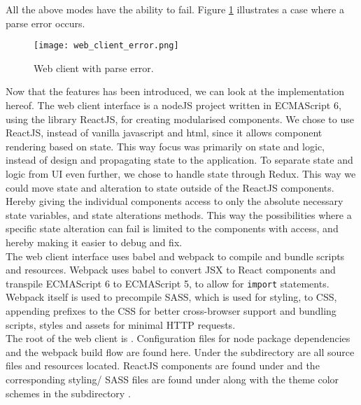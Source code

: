 \noindent
All the above modes have the ability to fail. Figure \ref{fig:web_client_error} illustrates a case where a parse error occurs.

\begin{figure}[H]
  \texttt{[image: web\_client\_error.png]}
  \caption{Web client with parse error.}
  \label{fig:web_client_error}
\end{figure}


\noindent
Now that the features has been introduced, we can look at the implementation hereof.
The web client interface is a nodeJS project written in ECMAScript 6, using the library ReactJS, for creating modularised components.
We chose to use ReactJS, instead of vanilla javascript and html, since it allows component rendering based on state.
This way focus was primarily on state and logic, instead of design and propagating state to the application.
To separate state and logic from UI even further, we chose to handle state through Redux.
This way we could move state and alteration to state outside of the ReactJS components. Hereby giving the individual components access to only the absolute necessary state variables, and state alterations methods.
This way the possibilities where a specific state alteration can fail is limited to the components with access, and hereby making it easier to debug and fix.\\

\noindent
The web client interface uses babel and webpack to compile and bundle scripts and resources.
Webpack uses babel to convert JSX to React components and transpile ECMAScript 6 to ECMAScript 5, to allow for \texttt{import} statements.
Webpack itself is used to precompile SASS, which is used for styling, to CSS, appending prefixes to the CSS for better cross-browser support and bundling scripts, styles and assets for minimal HTTP requests.\\

\noindent
The root of the web client is . Configuration files for node package dependencies and the webpack build flow are found here.
Under the subdirectory  are all source files and resources located.
ReactJS components are found under  and the corresponding styling/ SASS files are found under  along with the theme color schemes in the subdirectory .\\

